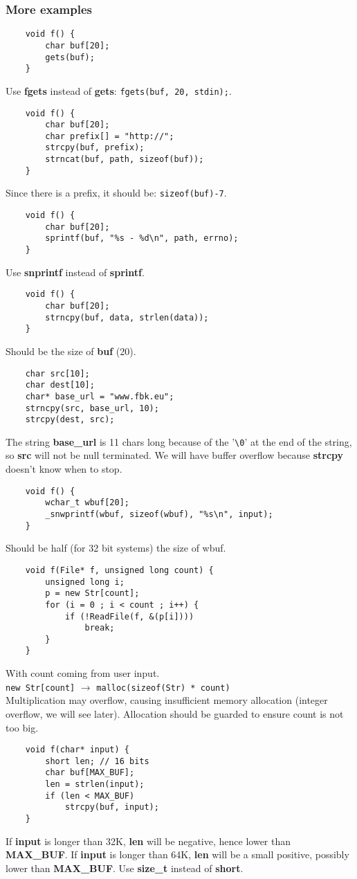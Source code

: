 \documentclass[a4paper, 10pt, titlepage]{article}
\begin{document}
\subsubsection*{More examples}
\begin{lstlisting}
	void f() {
		char buf[20];
		gets(buf);
	}
\end{lstlisting}
Use \textbf{fgets} instead of \textbf{gets}: \lstinline|fgets(buf, 20, stdin);|.
\begin{lstlisting}
	void f() {
		char buf[20];
		char prefix[] = "http://";
		strcpy(buf, prefix);
		strncat(buf, path, sizeof(buf));
	}
\end{lstlisting}
Since there is a prefix, it should be: \lstinline|sizeof(buf)-7|.
\begin{lstlisting}
	void f() {
		char buf[20];
		sprintf(buf, "%s - %d\n", path, errno);
	}
\end{lstlisting}
Use \textbf{snprintf} instead of \textbf{sprintf}.
\begin{lstlisting}
	void f() {
		char buf[20];
		strncpy(buf, data, strlen(data));
	}
\end{lstlisting}
Should be the size of \textbf{buf} (20).
\begin{lstlisting}
	char src[10];
	char dest[10];
	char* base_url = "www.fbk.eu";
	strncpy(src, base_url, 10);
	strcpy(dest, src);
\end{lstlisting}
The string \textbf{base\_url} is 11 chars long because of the '\lstinline|\0|' at the end of the string, so \textbf{src} will not be null terminated. We will have buffer overflow because \textbf{strcpy} doesn’t know when to stop.
\begin{lstlisting}
	void f() {
		wchar_t wbuf[20];
		_snwprintf(wbuf, sizeof(wbuf), "%s\n", input);
	}
\end{lstlisting}
Should be half (for 32 bit systems) the size of wbuf.
\begin{lstlisting}
	void f(File* f, unsigned long count) {
		unsigned long i;
		p = new Str[count];
		for (i = 0 ; i < count ; i++) {
			if (!ReadFile(f, &(p[i])))
				break;
		}
	}
\end{lstlisting}
With count coming from user input.\\ \lstinline|new Str[count]| $\rightarrow$ \lstinline|malloc(sizeof(Str) * count)| \\
Multiplication may overflow, causing insufficient memory
allocation (integer overflow, we will see later). Allocation should be guarded to ensure count is not too big.
\begin{lstlisting}
	void f(char* input) {
		short len; // 16 bits
		char buf[MAX_BUF];
		len = strlen(input);
		if (len < MAX_BUF)
			strcpy(buf, input);
	}
\end{lstlisting}
If \textbf{input} is longer than 32K, \textbf{len} will be negative, hence lower than \textbf{MAX\_BUF}. If \textbf{input} is longer than 64K, \textbf{len} will be a small positive, possibly lower than \textbf{MAX\_BUF}. Use \textbf{size\_t} instead of \textbf{short}. \medskip
\end{document}
